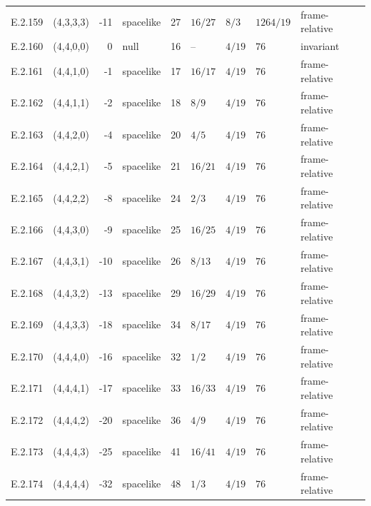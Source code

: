 {\begin{longtable}{@{}llrlrllll@{}}
E.2.159 & (4,3,3,3) & -11 & spacelike & 27 & $16/27$ & $8/3$ & $1264/19$ & frame-relative \\
E.2.160 & (4,4,0,0) & 0 & null & 16 & -- & $4/19$ & $76$ & invariant \\
E.2.161 & (4,4,1,0) & -1 & spacelike & 17 & $16/17$ & $4/19$ & $76$ & frame-relative \\
E.2.162 & (4,4,1,1) & -2 & spacelike & 18 & $8/9$ & $4/19$ & $76$ & frame-relative \\
E.2.163 & (4,4,2,0) & -4 & spacelike & 20 & $4/5$ & $4/19$ & $76$ & frame-relative \\
E.2.164 & (4,4,2,1) & -5 & spacelike & 21 & $16/21$ & $4/19$ & $76$ & frame-relative \\
E.2.165 & (4,4,2,2) & -8 & spacelike & 24 & $2/3$ & $4/19$ & $76$ & frame-relative \\
E.2.166 & (4,4,3,0) & -9 & spacelike & 25 & $16/25$ & $4/19$ & $76$ & frame-relative \\
E.2.167 & (4,4,3,1) & -10 & spacelike & 26 & $8/13$ & $4/19$ & $76$ & frame-relative \\
E.2.168 & (4,4,3,2) & -13 & spacelike & 29 & $16/29$ & $4/19$ & $76$ & frame-relative \\
E.2.169 & (4,4,3,3) & -18 & spacelike & 34 & $8/17$ & $4/19$ & $76$ & frame-relative \\
E.2.170 & (4,4,4,0) & -16 & spacelike & 32 & $1/2$ & $4/19$ & $76$ & frame-relative \\
E.2.171 & (4,4,4,1) & -17 & spacelike & 33 & $16/33$ & $4/19$ & $76$ & frame-relative \\
E.2.172 & (4,4,4,2) & -20 & spacelike & 36 & $4/9$ & $4/19$ & $76$ & frame-relative \\
E.2.173 & (4,4,4,3) & -25 & spacelike & 41 & $16/41$ & $4/19$ & $76$ & frame-relative \\
E.2.174 & (4,4,4,4) & -32 & spacelike & 48 & $1/3$ & $4/19$ & $76$ & frame-relative \\
\end{longtable}}
